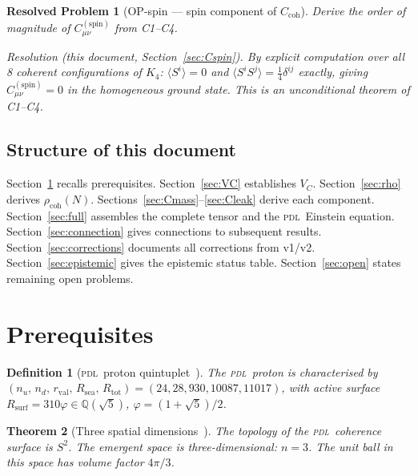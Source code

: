\documentclass[12pt,a4paper]{article}
\newtheorem{theorem}{Theorem}[section]
\newtheorem{definition}[theorem]{Definition}
\newtheorem{resolvedproblem}{Resolved Problem}
\newcommand{\Kfour}{K_4}
\newcommand{\PDL}{\textsc{pdl}}
\newcommand{\Ccoh}{C_{\mathrm{coh}}}
\newcommand{\Cspin}{C^{(\mathrm{spin})}}
\newcommand{\rhocoh}{\rho_{\mathrm{coh}}}
\newcommand{\Rsurf}{R_{\mathrm{surf}}}
\newcommand{\Rtot}{R_{\mathrm{tot}}}
\newcommand{\Rsea}{R_{\mathrm{sea}}}
\newcommand{\rval}{r_{\mathrm{val}}}
\newcommand{\VC}{V_C}
\newcommand{\vp}{\varphi}
\newcommand{\nuu}{n_u}
\newcommand{\quintuplet}{(24,28,930,10087,11017)}
\begin{document}
\begin{resolvedproblem}[OP-spin --- spin component of $\Ccoh$]
\label{rp:OPspin}
Derive the order of magnitude of $\Cspin_{\mu\nu}$ from C1--C4.

\emph{Resolution (this document, Section~\ref{sec:Cspin}).} By explicit computation over all 8 coherent configurations of $\Kfour$: $\langle S^i\rangle = 0$ and $\langle S^i S^j\rangle = \tfrac{1}{4}\delta^{ij}$ exactly, giving $\Cspin_{\mu\nu} = 0$ in the homogeneous ground state. This is an unconditional theorem of C1--C4.
\end{resolvedproblem}

\subsection{Structure of this document}

Section~\ref{sec:prereq} recalls prerequisites. Section~\ref{sec:VC} establishes $\VC$. Section~\ref{sec:rho} derives $\rhocoh(N)$. Sections~\ref{sec:Cmass}--\ref{sec:Cleak} derive each component. Section~\ref{sec:full} assembles the complete tensor and the \PDL\ Einstein equation. Section~\ref{sec:connection} gives connections to subsequent results. Section~\ref{sec:corrections} documents all corrections from v1/v2. Section~\ref{sec:epistemic} gives the epistemic status table. Section~\ref{sec:open} states remaining open problems.

\section{Prerequisites}
\label{sec:prereq}

\begin{definition}[\PDL\ proton quintuplet~{\cite{PDL_D16b_2026,PDL_D29_2026}}]
\label{def:quintuplet}
The \PDL\ proton is characterised by $(\nuu,\,n_d,\,\rval,\,\Rsea,\,\Rtot) = \quintuplet$, with active surface $\Rsurf = 310\vp \in \mathbb{Q}(\sqrt{5})$, $\vp = (1+\sqrt{5})/2$.
\end{definition}

\begin{theorem}[Three spatial dimensions~{\cite{PDL_D23_2026}}]
\label{thm:D23}
The topology of the \PDL\ coherence surface is $S^2$. The emergent space is three-dimensional: $n = 3$. The unit ball in this space has volume factor $4\pi/3$.
\end{theorem}
\end{document}
